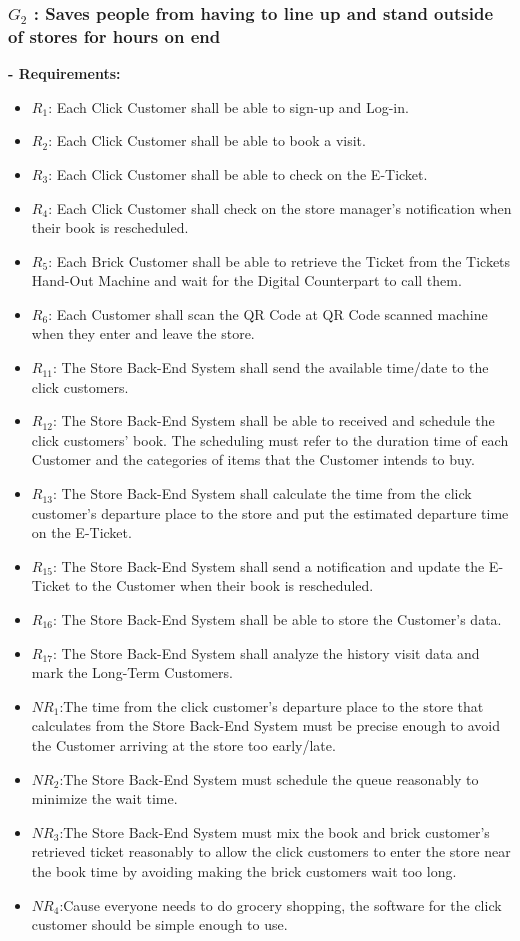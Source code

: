 \documentclass[a4paper,12pt]{report}
\begin{document}
\subsubsection{$G_2$ : Saves people from having to line up and stand outside of stores for hours on end}

\textbf{- Requirements:}
\begin{itemize}
	\item $R_1$: Each Click Customer shall be able to sign-up and Log-in.
	\item $R_2$: Each Click Customer shall be able to book a visit.
	\item $R_3$: Each Click Customer shall be able to check on the E-Ticket.
	\item $R_4$: Each Click Customer shall check on the store manager's notification when their book is rescheduled.
	\item $R_5$: Each Brick Customer shall be able to retrieve the Ticket from the Tickets Hand-Out Machine and wait for the Digital Counterpart to call them.
	\item $R_6$: Each Customer shall scan the QR Code at QR Code scanned machine when they enter and leave the store.
	\item $R_{11}$: The Store Back-End System shall send the available time/date to the click customers. 
	\item $R_{12}$: The Store Back-End System shall be able to received and schedule the click customers’ book. The scheduling must refer to the duration time of each Customer and the categories of items that the Customer intends to buy.
	\item $R_{13}$: The Store Back-End System shall calculate the time from the click customer’s departure place to the store and put the estimated departure time on the E-Ticket. 
	\item $R_{15}$: The Store Back-End System shall send a notification and update the E-Ticket to the Customer when their book is rescheduled. 
	\item $R_{16}$: The Store Back-End System shall be able to store the Customer’s data.
	\item $R_{17}$: The Store Back-End System shall analyze the history visit data and mark the Long-Term Customers. 
	\item $NR_1$:The time from the click customer's departure place to the store that calculates from the Store Back-End System must be precise enough to avoid the Customer arriving at the store too early/late.
	\item $NR_2$:The Store Back-End System must schedule the queue reasonably to minimize the wait time.
	\item $NR_3$:The Store Back-End System must mix the book and brick customer's retrieved ticket reasonably to allow the click customers to enter the store near the book time by avoiding making the brick customers wait too long.
	\item $NR_4$:Cause everyone needs to do grocery shopping, the software for the click customer should be simple enough to use.
\end{itemize}
\end{document}

